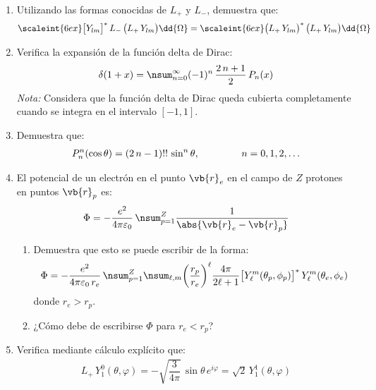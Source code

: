 \begin{enumerate}
\item Utilizando las formas conocidas de $L_{+}$ y $L_{-}$, demuestra que:
\begin{align*}
\scaleint{6ex} \big[ Y_{lm} \big]^{*} \, L_{-} \, \big( L_{+} \, Y_{lm} \big) \dd{\Omega} = \scaleint{6ex} \big( L_{+} \, Y_{lm} \big)^{*} \, \big( L_{+} \, Y_{lm} \big) \dd{\Omega}
\end{align*}
\item Verifica la expansión de la función delta de Dirac:
\begin{align*}
\delta (1 + x) = \nsum_{n=0}^{\infty} (-1)^{n} \, \dfrac{2 \,n + 1}{2} \, P_{n} (x)
\end{align*}
\emph{Nota:} Considera que la función delta de Dirac queda cubierta completamente cuando se integra en el intervalo $[-1, 1]$.
\item Demuestra que:
\begin{align*}
P_{n}^{n} (\cos \theta) = (2 \, n - 1)!! \, \sin^{n} \theta, \hspace{1.5cm} n = 0, 1, 2, \ldots
\end{align*}
\item El potencial de un electrón en el punto $\vb{r}_{e}$ en el campo de $Z$ protones en puntos $\vb{r}_{p}$ es:
\begin{align*}
\Phi = - \dfrac{e^{2}}{4 \pi \varepsilon_{0}} \, \nsum_{p=1}^{Z} \dfrac{1}{\abs{\vb{r}_{e} - \vb{r}_{p}}}
\end{align*}
\begin{enumerate}[label=\roman*)]
\item Demuestra que esto se puede escribir de la forma:
\begin{align*}
\Phi = - \dfrac{e^{2}}{4 \pi \varepsilon_{0} \, r_{e}} \, \nsum_{p=1}^{Z} \nsum_{\ell, m} \bigg( \dfrac{r_{p}}{r_{e}} \bigg)^{\ell} \dfrac{4 \pi}{2 \ell + 1} \big[ Y_{\ell}^{m} (\theta_{p}, \phi_{p}) \big]^{*} \, Y_{\ell}^{m} (\theta_{e}, \phi_{e})
\end{align*}
donde $r_{e} > r_{p}$.
\item ¿Cómo debe de escribirse $\Phi$ para $r_{e} < r_{p}$?
\end{enumerate}
\item Verifica mediante cálculo explícito que:
\begin{align*}
L_{+} \, Y_{1}^{0} (\theta, \varphi) = - \sqrt{\dfrac{3}{4 \pi}} \, \sin \theta \, e^{i \varphi} = \sqrt{2} \, Y_{1}^{1} (\theta, \varphi)

\end{align*}
\end{enumerate}
